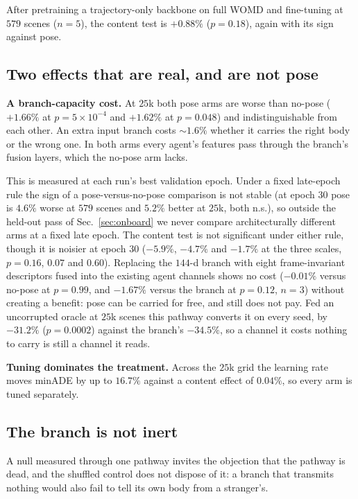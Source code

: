 \documentclass[conference]{IEEEtran}
\newcommand{\minADE}{minADE\xspace}
\begin{document}
After pretraining a trajectory-only backbone on full WOMD and fine-tuning at
$579$ scenes ($n{=}5$), the content test is $+0.88\%$ ($p{=}0.18$), again with
its sign against pose.

\subsection{Two effects that are real, and are not pose}
\label{sec:real}
\textbf{A branch-capacity cost.} At $25$k both pose arms are worse than no-pose
($+1.66\%$ at $p{=}5{\times}10^{-4}$ and $+1.62\%$ at $p{=}0.048$) and indistinguishable
from each other. An extra input branch costs ${\sim}1.6\%$ whether it carries the
right body or the wrong one. In both arms every agent's features pass through the branch's fusion
layers, which the no-pose arm lacks.

This is measured at each run's best validation epoch. Under a fixed
late-epoch rule the sign of a pose-versus-no-pose comparison is not stable (at
epoch $30$ pose is $4.6\%$ worse at $579$ scenes and $5.2\%$ better at $25$k,
both n.s.), so outside the held-out pass of Sec.~\ref{sec:onboard} we never
compare architecturally different arms at a fixed late epoch. The content test is not significant under
either rule, though it is noisier at epoch $30$ ($-5.9\%$, $-4.7\%$ and
$-1.7\%$ at the three scales, $p{=}0.16$, $0.07$ and $0.60$). Replacing the $144$-d branch with eight frame-invariant descriptors
fused into the existing agent channels shows no cost ($-0.01\%$ versus
no-pose at $p{=}0.99$, and $-1.67\%$ versus the branch at $p{=}0.12$, $n{=}3$) without
creating a benefit: pose can be carried for free, and still does not pay. Fed
an uncorrupted oracle at $25$k scenes this pathway converts it on every seed,
by $-31.2\%$ ($p{=}0.0002$) against the branch's $-34.5\%$, so a channel it
costs nothing to carry is still a channel it reads.

\textbf{Tuning dominates the treatment.} Across the $25$k grid the learning rate
moves \minADE by up to $16.7\%$ against a content effect of $0.04\%$, so
every arm is tuned separately.

\subsection{The branch is not inert}
\label{sec:poscontrol}
A null measured through one pathway invites the objection that the pathway is
dead, and the shuffled control does not dispose of it: a branch that transmits
nothing would also fail to tell its own body from a stranger's.
\end{document}

